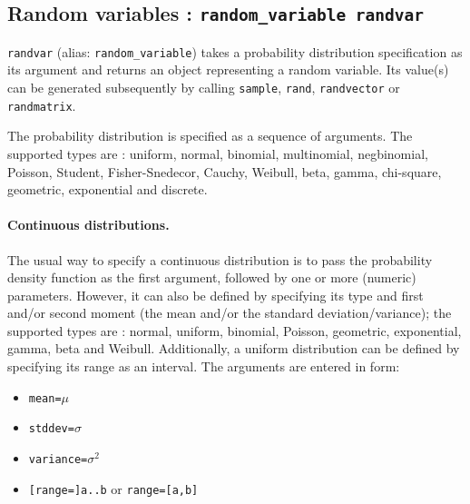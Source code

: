 \subsection{Random variables : {\tt random\_variable randvar}}

{\tt randvar} (alias: {\tt random\_variable}) takes a probability distribution specification as its argument and returns an object representing a random variable. Its value(s) can be generated subsequently by calling {\tt sample}, {\tt rand}, {\tt randvector} or {\tt randmatrix}.

The probability distribution is specified as a sequence of arguments. The supported types are : uniform, normal, binomial, multinomial, negbinomial, Poisson, Student, Fisher-Snedecor, Cauchy, Weibull, beta, gamma, chi-square, geometric, exponential and discrete.

\paragraph{Continuous distributions.} The usual way to specify a continuous distribution is to pass the probability density function as the first argument, followed by one or more (numeric) parameters. However, it can also be defined by specifying its type and first and/or second moment (the mean and/or the standard deviation/variance); the supported types are : normal, uniform, binomial, Poisson, geometric, exponential, gamma, beta and Weibull. Additionally, a uniform distribution can be defined by specifying its range as an interval. The arguments are entered in form:
\begin{itemize}
  \item {\tt mean=}$\mu$
  \item {\tt stddev=}$\sigma$
  \item {\tt variance=}$\sigma^2$
  \item {\tt [range=]a..b} or {\tt range=[a,b]}
\end{itemize}

